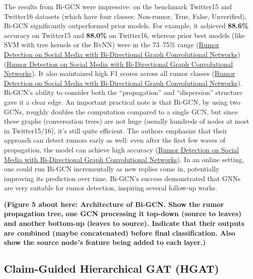 \documentclass[12pt,a4paper]{report}
\begin{document}
The results from Bi-GCN were impressive: on the benchmark Twitter15 and Twitter16 datasets (which have four classes: Non-rumor, True, False, Unverified), Bi-GCN significantly outperformed prior models. For example, it achieved \textbf{88.6\%} accuracy on Twitter15 and \textbf{88.0\%} on Twitter16, whereas prior best models (like SVM with tree kernels or the RvNN) were in the 73–75\% range (\href{https://ojs.aaai.org/index.php/AAAI/article/view/5393/5249#:~:text=DTC%200,N%20F%20TU}{Rumor Detection on Social Media with Bi-Directional Graph Convolutional Networks}) (\href{https://ojs.aaai.org/index.php/AAAI/article/view/5393/5249#:~:text=DTC%200,865}{Rumor Detection on Social Media with Bi-Directional Graph Convolutional Networks}). It also maintained high F1 scores across all rumor classes (\href{https://ojs.aaai.org/index.php/AAAI/article/view/5393/5249#:~:text=RvNN%200,526}{Rumor Detection on Social Media with Bi-Directional Graph Convolutional Networks}). Bi-GCN’s ability to consider both the “propagation” and “dispersion” structure gave it a clear edge. An important practical note is that Bi-GCN, by using two GCNs, roughly doubles the computation compared to a single GCN, but since these graphs (conversation trees) are not huge (usually hundreds of nodes at most in Twitter15/16), it’s still quite efficient. The authors emphasize that their approach can detect rumors early as well: even after the first few waves of propagation, the model can achieve high accuracy (\href{https://ojs.aaai.org/index.php/AAAI/article/view/5393/5249#:~:text=relatively%20high%20accuracy%20at%20a,that%20structural%20features%20are%20not}{Rumor Detection on Social Media with Bi-Directional Graph Convolutional Networks}). In an online setting, one could run Bi-GCN incrementally as new replies come in, potentially improving its prediction over time. Bi-GCN’s success demonstrated that GNNs are very suitable for rumor detection, inspiring several follow-up works.

\textbf{(Figure 5 about here: Architecture of Bi-GCN. Show the rumor propagation tree, one GCN processing it top-down (source to leaves) and another bottom-up (leaves to source). Indicate that their outputs are combined (maybe concatenated) before final classification. Also show the source node’s feature being added to each layer.)}

\subsection{Claim-Guided Hierarchical GAT (HGAT)}
\end{document}
